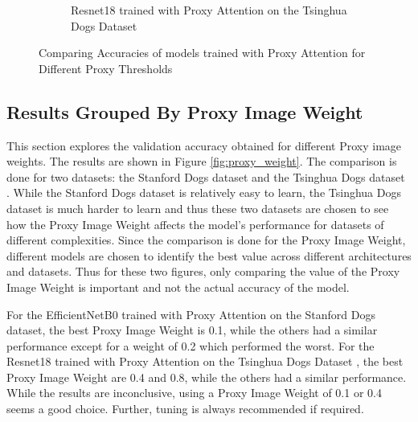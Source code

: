 \documentclass[a4paper,11pt,openright]{book}
\begin{document}
\begin{figure}[!htb]
\begin{subfigure}[h]{.5\textwidth}
        \caption{Resnet18 \cite{heDeepResidualLearning2016} trained with Proxy Attention on the Tsinghua Dogs Dataset \cite{zouNewDatasetDog2020}}
    \end{subfigure}
    
    \caption{Comparing Accuracies of models trained with Proxy Attention for Different Proxy Thresholds}
    \label{fig:proxy_threshold}
\end{figure}

\subsection{Results Grouped By Proxy Image Weight}
This section explores the validation accuracy obtained for different Proxy image weights. The results are shown in Figure \ref{fig:proxy_weight}. 
The comparison is done for two datasets: the Stanford Dogs dataset \cite{khoslaNovelDatasetFineGrained} and the Tsinghua Dogs dataset \cite{zouNewDatasetDog2020}. While the Stanford Dogs dataset is relatively easy to learn, the Tsinghua Dogs dataset is much harder to learn and thus these two datasets are chosen to see how the Proxy Image Weight affects the model's performance for datasets of different complexities. Since the comparison is done for the Proxy Image Weight, different models are chosen to identify the best value across different architectures and datasets. Thus for these two figures, only comparing the value of the Proxy Image Weight is important and not the actual accuracy of the model.

For the EfficientNetB0 \cite{tanEfficientnetRethinkingModel2019} trained with Proxy Attention on the Stanford Dogs dataset\cite{khoslaNovelDatasetFineGrained}, the best Proxy Image Weight is 0.1, while the others had a similar performance except for a weight of 0.2 which performed the worst. For the Resnet18 \cite{heDeepResidualLearning2016} trained with Proxy Attention on the Tsinghua Dogs Dataset \cite{zouNewDatasetDog2020}, the best Proxy Image Weight are 0.4 and 0.8, while the others had a similar performance.
While the results are inconclusive, using a Proxy Image Weight of 0.1 or 0.4 seems a good choice. Further, tuning is always recommended if required.
\end{document}
